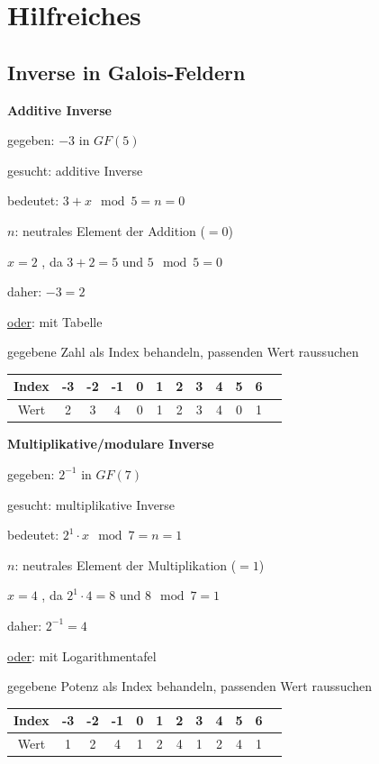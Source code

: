 \appendix

\section{Hilfreiches}

\subsection{Inverse in Galois-Feldern}

\textbf{Additive Inverse}

gegeben: $-3$ in $GF(5)$

gesucht: additive Inverse

bedeutet: $3 + x \mod 5 = n = 0$

$n$: neutrales Element der Addition ($=0$)

$x = 2$ , da $3 + 2 = 5$ und $5 \mod 5 = 0$

daher: $-3 = 2$

\underline{oder}: mit Tabelle

gegebene Zahl als Index behandeln, passenden Wert raussuchen

\begin{tabular}{ c | c | c | c | c | c | c | c | c | c | c | c | }
    Index & -3 & -2 & -1 & 0 & 1 & 2 & 3 & 4 & 5 & 6\\
    \hline
    Wert  & 2  &  3 &  4  & 0 & 1 & 2 & 3 & 4 & 0 & 1
\end{tabular}

\textbf{Multiplikative/modulare Inverse}

gegeben: $2^{-1}$ in $GF(7)$

gesucht: multiplikative Inverse

bedeutet: $2^{1} \cdot x \mod 7 = n = 1$

$n$: neutrales Element der Multiplikation ($=1$)

$x = 4$ , da $2^{1} \cdot 4 = 8$ und $8 \mod 7 = 1$

daher: $2^{-1} = 4$

\underline{oder}: mit Logarithmentafel

gegebene Potenz als Index behandeln, passenden Wert raussuchen

\begin{tabular}{ c | c | c | c | c | c | c | c | c | c | c | c | }
    Index  & -3 & -2 & -1 & 0 & 1 & 2 & 3 & 4 & 5 & 6\\
    \hline
    Wert   &  1 &  2 &  4 & 1 & 2 & 4 & 1 & 2 & 4 & 1
\end{tabular}

